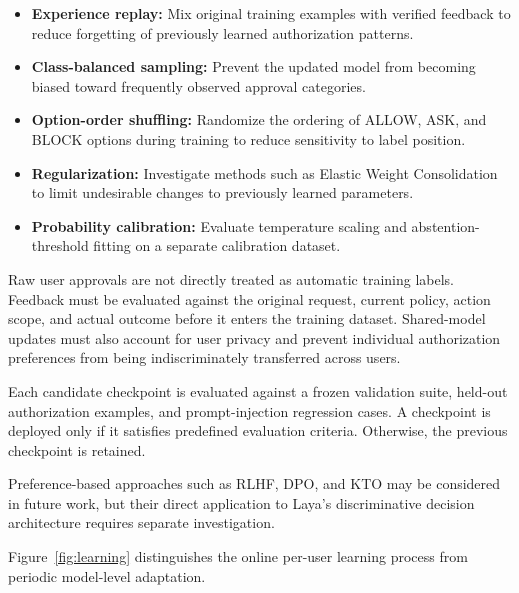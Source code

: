 \documentclass[10pt,conference]{IEEEtran}
\begin{document}
\begin{itemize}

    \item \textbf{Experience replay:} Mix original training examples with verified feedback to reduce forgetting of previously learned authorization patterns.

    \item \textbf{Class-balanced sampling:} Prevent the updated model from becoming biased toward frequently observed approval categories.

    \item \textbf{Option-order shuffling:} Randomize the ordering of ALLOW, ASK, and BLOCK options during training to reduce sensitivity to label position.

    \item \textbf{Regularization:} Investigate methods such as Elastic Weight Consolidation to limit undesirable changes to previously learned parameters.

    \item \textbf{Probability calibration:} Evaluate temperature scaling and abstention-threshold fitting on a separate calibration dataset.

\end{itemize}

Raw user approvals are not directly treated as automatic training labels. Feedback must be evaluated against the original request, current policy, action scope, and actual outcome before it enters the training dataset. Shared-model updates must also account for user privacy and prevent individual authorization preferences from being indiscriminately transferred across users.

Each candidate checkpoint is evaluated against a frozen validation suite, held-out authorization examples, and prompt-injection regression cases. A checkpoint is deployed only if it satisfies predefined evaluation criteria. Otherwise, the previous checkpoint is retained.

Preference-based approaches such as RLHF, DPO, and KTO may be considered in future work, but their direct application to Laya's discriminative decision architecture requires separate investigation.

Figure~\ref{fig:learning} distinguishes the online per-user learning process from periodic model-level adaptation.
\end{document}
